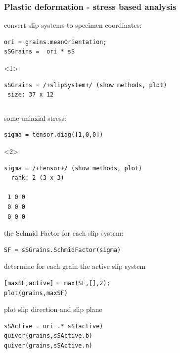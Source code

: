 \documentclass[compress]{beamer}
\begin{document}
\begin{frame}[fragile]
  \frametitle{Plastic deformation - stress based analysis}

convert slip systems to specimen coordinates:
\vspace{-0.2cm}
\begin{lstlisting}[style=input]
ori = grains.meanOrientation;
sSGrains =  ori * sS
\end{lstlisting}
      \begin{onlyenv}<1>
        \vspace{-0.2cm}
      \begin{lstlisting}[style=output]
sSGrains = /+slipSystem+/ (show methods, plot)
 size: 37 x 12
      \end{lstlisting}
    \end{onlyenv}

\pause
\begin{columns}
  \begin{column}{0.65\textwidth}

some uniaxial stress:
\vspace{-0.2cm}
  \begin{lstlisting}[style=input]
sigma = tensor.diag([1,0,0])
\end{lstlisting}
      \begin{onlyenv}<2>
        \vspace{-0.2cm}
        \begin{lstlisting}[style=output]
sigma = /+tensor+/ (show methods, plot)
  rank: 2 (3 x 3)

 1 0 0
 0 0 0
 0 0 0
      \end{lstlisting}
    \end{onlyenv}

\pause

the Schmid Factor for each slip system:
\vspace{-0.2cm}
\begin{lstlisting}[style=input]
SF = sSGrains.SchmidFactor(sigma)
\end{lstlisting}

\pause

determine for each grain the active slip system
\vspace{-0.2cm}
\begin{lstlisting}[style=input]
[maxSF,active] = max(SF,[],2);
plot(grains,maxSF)
\end{lstlisting}

\pause

plot slip direction and slip plane
\vspace{-0.2cm}
\begin{lstlisting}[style=input]
sSActive = ori .* sS(active)
quiver(grains,sSActive.b)
quiver(grains,sSActive.n)
\end{lstlisting}


\end{column}
\end{columns}
\end{frame}
\end{document}

